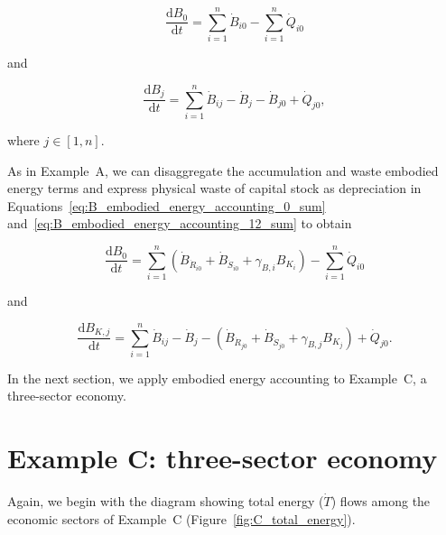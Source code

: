 \begin{equation} \label{eq:B_embodied_energy_accounting_0_sum}
	\frac{\mathrm{d}B_{0}}{\mathrm{d}t} 
	= \sum\limits_{i=1}^n\dot{B}_{i0} 
	- \sum\limits_{i=1}^n\dot{Q}_{i0} 
\end{equation}

\noindent and

\begin{equation} \label{eq:B_embodied_energy_accounting_12_sum}
	\frac{\mathrm{d}B_{j}}{\mathrm{d}t} 
	= \sum\limits_{i=1}^n\dot{B}_{ij} 
	- \dot{B}_{j}
	- \dot{B}_{j0} 
	+ \dot{Q}_{j0},
\end{equation}

\noindent where $j \in [1, n]$.

As in Example~A, 
we can disaggregate the accumulation and waste embodied energy terms 
and express physical waste of capital stock as depreciation 
in Equations~\ref{eq:B_embodied_energy_accounting_0_sum}
and~\ref{eq:B_embodied_energy_accounting_12_sum}
to obtain

\begin{equation} \label{eq:B_embodied_energy_accounting_0_with_depreciation}
	\frac{\mathrm{d}B_{0}}{\mathrm{d}t} 
	= \sum\limits_{i=1}^n 
		\left( \dot{B}_{\dot{R}_{i0}} 
				+ \dot{B}_{\dot{S}_{i0}} 
				+ \gamma_{B,i} B_{K_{i}} \right)
	- \sum\limits_{i=1}^n\dot{Q}_{i0} 
\end{equation}

\noindent and

\begin{equation} \label{eq:B_embodied_energy_accounting_12_with_depreciation}
	\frac{\mathrm{d}B_{K,j}}{\mathrm{d}t} 
	= \sum\limits_{i=1}^n\dot{B}_{ij} 
	- \dot{B}_{j}
	- \left( \dot{B}_{\dot{R}_{j0}}
		+ \dot{B}_{\dot{S}_{j0}}
		+ \gamma_{B,j} B_{K_{j}} \right)
	+ \dot{Q}_{j0}.
\end{equation}

In the next section, we apply embodied energy accounting to 
Example~C, a three-sector economy.


\section{Example C: three-sector economy} %
\label{sec:Embodied_Energy_Example_C}

Again, we begin with the diagram showing total energy ($\dot{T}$) flows
among the economic sectors of Example~C (Figure~\ref{fig:C_total_energy}).

